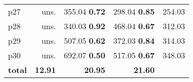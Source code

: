 \begin{tabular}{lrrrr}
\multicolumn{1}{l|}{p27} & uns. & {\footnotesize 355.04} \textbf{0.72} & {\footnotesize 298.04} \textbf{0.85} & \multicolumn{1}{|r}{254.03}\\
\multicolumn{1}{l|}{p28} & uns. & {\footnotesize 340.03} \textbf{0.92} & {\footnotesize 468.04} \textbf{0.67} & \multicolumn{1}{|r}{312.03}\\
\multicolumn{1}{l|}{p29} & uns. & {\footnotesize 507.05} \textbf{0.62} & {\footnotesize 372.03} \textbf{0.84} & \multicolumn{1}{|r}{314.03}\\
\multicolumn{1}{l|}{p30} & uns. & {\footnotesize 692.07} \textbf{0.50} & {\footnotesize 517.05} \textbf{0.67} & \multicolumn{1}{|r}{348.03}\\
\midrule
\textbf{total} & \textbf{12.91} & \textbf{20.95} & \textbf{21.60} & \\
\bottomrule
\end{tabular}


